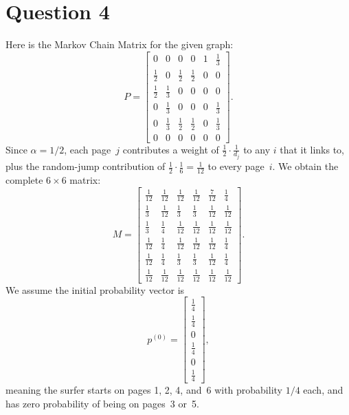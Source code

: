 \documentclass{article}
\begin{document}
\section*{Question 4}
Here is the Markov Chain Matrix for the given graph:
$$
    P
    =
    \begin{bmatrix}
        0        & 0        & 0        & 0        & 1 & \tfrac13 \\[3pt]
        \tfrac12 & 0        & \tfrac12 & \tfrac12 & 0 & 0        \\[3pt]
        \tfrac12 & \tfrac13 & 0        & 0        & 0 & 0        \\[3pt]
        0        & \tfrac13 & 0        & 0        & 0 & \tfrac13 \\[3pt]
        0        & \tfrac13 & \tfrac12 & \tfrac12 & 0 & \tfrac13 \\[3pt]
        0        & 0        & 0        & 0        & 0 & 0
    \end{bmatrix}.
$$
Since $\alpha=1/2$, each page~$j$ contributes a weight of $\tfrac12 \cdot \tfrac{1}{d_j}$ to any $i$ that it links to, plus the random-jump contribution of $\tfrac12 \cdot \tfrac{1}{6}=\tfrac{1}{12}$ to every page~$i$. We obtain the complete $6\times 6$ matrix:
$$
    M
    =
    \begin{bmatrix}
        \frac{1}{12} & \frac{1}{12} & \frac{1}{12} & \frac{1}{12} & \frac{7}{12} & \frac{1}{4}  \\[5pt]
        \frac{1}{3}  & \frac{1}{12} & \frac{1}{3}  & \frac{1}{3}  & \frac{1}{12} & \frac{1}{12} \\[5pt]
        \frac{1}{3}  & \frac{1}{4}  & \frac{1}{12} & \frac{1}{12} & \frac{1}{12} & \frac{1}{12} \\[5pt]
        \frac{1}{12} & \frac{1}{4}  & \frac{1}{12} & \frac{1}{12} & \frac{1}{12} & \frac{1}{4}  \\[5pt]
        \frac{1}{12} & \frac{1}{4}  & \frac{1}{3}  & \frac{1}{3}  & \frac{1}{12} & \frac{1}{4}  \\[5pt]
        \frac{1}{12} & \frac{1}{12} & \frac{1}{12} & \frac{1}{12} & \frac{1}{12} & \frac{1}{12}
    \end{bmatrix}.
$$
We assume the initial probability vector is
$$
    p^{(0)}
    =
    \begin{bmatrix}
        \tfrac14 \\[3pt]
        \tfrac14 \\[3pt]
        0        \\[3pt]
        \tfrac14 \\[3pt]
        0        \\[3pt]
        \tfrac14
    \end{bmatrix},
$$
meaning the surfer starts on pages 1, 2, 4, and~6 with probability $1/4$ each, and has zero probability of being on pages~3 or~5.
\end{document}
